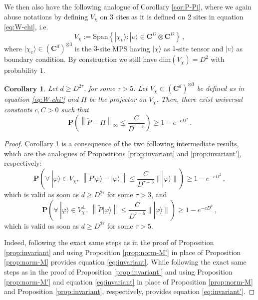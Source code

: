 \documentclass{amsart}
\newtheorem{corollary}[theorem]{Corollary}
\newcommand{\C}{\mathbf{C}}
\renewcommand{\P}{\mathbf{P}}
\renewcommand{\leq}{\leqslant}
\renewcommand{\geq}{\geqslant}
\newcommand{\ket}[1]{| #1 \rangle}
\begin{document}
We then also have the following analogue of Corollary \ref{cor:P-Pi}, where we again abuse notations by defining $V_\chi$ on $3$ sites as it is defined on $2$ sites in equation \eqref{eq:W-chi}, i.e.
\begin{equation} \label{eq:W-chi'}
    V_{\chi} := \mathrm{Span} \left\{ \ket{\chi_{\upsilon}} : \ket{\upsilon}\in\C^D\otimes\C^D \right\} \, ,
\end{equation}
where $\ket{\chi_{\upsilon}}\in(\C^d)^{\otimes 3}$ is the $3$-site MPS having $\ket{\chi}$ as $1$-site tensor and $\ket{\upsilon}$ as boundary condition. By construction we still have $\mathrm{dim}(V_{\chi})=D^2$ with probability $1$.

\begin{corollary} \label{cor:P-Pi'}
    Let $d\geq D^{2\tau}$, for some $\tau>5$. Let $V_{\chi}\subset(\C^d)^{\otimes 3}$ be defined as in equation \eqref{eq:W-chi'} and $\Pi$ be the projector on $V_{\chi}$. Then, there exist universal constants $c,C>0$ such that
    \[ \P\left( \left\| \widetilde{P}-\Pi\right\|_{\infty} \leq \frac{C}{D^{\tau-5}} \right) \geq 1-e^{-cD^2} \, . \]
\end{corollary}

\begin{proof}
    Corollary \ref{cor:P-Pi'} is a consequence of the two following intermediate results, which are the analogues of Propositions \ref{prop:invariant} and \ref{prop:invariant'}, respectively:
    \begin{equation} \label{eq:invariant} \P\left( \forall\ \ket{\varphi}\in V_{\chi},\ \left\| \widetilde{P}\ket{\varphi} - \ket{\varphi} \right\| \leq \frac{C}{D^{\tau-3}} \|\ket{\varphi}\| \right) \geq 1-e^{-cD^2} \, , \end{equation}
    which is valid as soon as $d\geq D^{2\tau}$ for some $\tau>3$, and
    \begin{equation} \label{eq:invariant'} \P\left( \forall\ \ket{\varphi}\in V_{\chi}^{\perp},\ \left\| \widetilde{P}\ket{\varphi}\right\| \leq \frac{C}{D^{\tau-5}} \|\ket{\varphi}\| \right) \geq 1-e^{-cD^2} \, , \end{equation}
    which is valid as soon as $d\geq D^{2\tau}$ for some $\tau>5$.

    Indeed, following the exact same steps as in the proof of Proposition \ref{prop:invariant} and using Proposition \ref{prop:norm-M'} in place of Proposition \ref{prop:norm-M} provides equation \eqref{eq:invariant}. While following the exact same steps as in the proof of Proposition \ref{prop:invariant'} and using Proposition \ref{prop:norm-M'} and equation \eqref{eq:invariant} in place of Proposition \ref{prop:norm-M} and Proposition \ref{prop:invariant}, respectively, provides equation \eqref{eq:invariant'}.
\end{proof}
\end{document}
